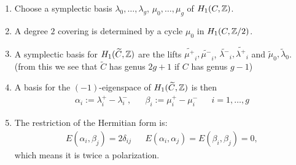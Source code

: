 \begin{frame}

\begin{enumerate}
	\item Choose a symplectic basis $\lambda_0, \ldots, \lambda_g$, $\mu_0, \ldots, \mu_g$ of $H_1(C,\mathbb{Z})$.
	\pause
	\item A degree $2$ covering is determined by a cycle $\mu_0$ in $H_1(C, \mathbb{Z}/2)$.
	\pause
	\item A symplectic basis for $H_1(\widetilde C, \mathbb{Z})$ are the lifts $\widetilde{\mu^+}_i, \widetilde{\mu^-}_i$, $\widetilde{\lambda^-}_i, \widetilde{\lambda^+}_i$ and $\widetilde{\mu}_0, \widetilde{\lambda}_0$. (from this we see that $\widetilde C$ has genus $2g+1$ if $C$ has genus $g-1$)
	\pause
	\item A basis for the $(-1)$-eigenspace of $H_1(\widetilde C,\mathbb{Z})$ is then
	\begin{align*}
	\alpha_i := \lambda_i^+ - \lambda_i^-, && \beta_i := \mu_i^+ - \mu_i^- && i=1,\ldots, g
	\end{align*}
	\pause
	\item The restriction of the Hermitian form is:
	\begin{align*}
	E(\alpha_i,\beta_j)= 2 \delta_{ij} && E(\alpha_i, \alpha_j) = E(\beta_i,\beta_j)=0,
	\end{align*}
	which means it is twice a polarization.
\end{enumerate}


\end{frame}